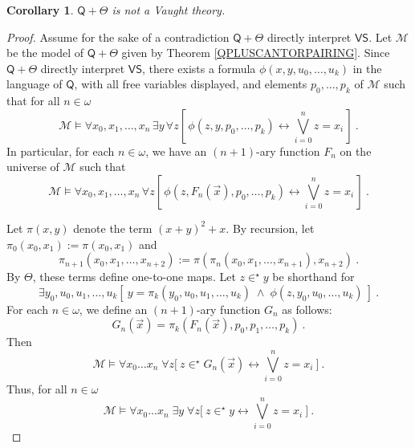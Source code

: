 \documentclass[10pt,a4paper, openany,  oldfontcommands]{memoir}
\newtheorem{corollary} [theorem] {Corollary}
\newtheorem{open problem} [theorem] {Open Problem}
\newtheorem{open question} [theorem] {Open Question}
\begin{document}
\begin{corollary}    \label{QPLUSCANTORPAIRINGCorollary}
$  \mathsf{Q} +  \Theta  $  is not a Vaught theory.
\end{corollary}
\begin{proof}
Assume for the sake of a contradiction $ \mathsf{Q} +  \Theta  $ directly interpret  $  \mathsf{VS} $.
Let  $  \mathcal{M} $  be the model of  $ \mathsf{Q} +  \Theta  $  given by Theorem  \ref{QPLUSCANTORPAIRING}. 
Since  $ \mathsf{Q} +  \Theta  $ directly interpret  $  \mathsf{VS} $, there exists a formula 
$  \phi (x, y  ,  u_0,  \ldots , u_k ) $  in the language of  $ \mathsf{Q} $, with all free variables displayed, 
 and   elements  $  p_0,  \ldots , p_k $  of   $  \mathcal{M} $  such that   for all  $  n  \in  \omega  $
\[
  \mathcal{M}   \models    
\forall  x_0,  x_1,  \ldots , x_n   \,   \exists   y   \,  \forall  z  \left[   \, 
  \phi ( z , y  ,  p_0,  \ldots , p_k ) \leftrightarrow   \bigvee_{ i = 0 }^{ n }  z = x_i   \,   \right] 
\          . 
\]
In particular, for each $ n  \in  \omega $, we have an $(n+1)$-ary function $  F_n $  on the universe of  $  \mathcal{M} $   such that 
\[
  \mathcal{M}   \models    
\forall  x_0,  x_1,  \ldots , x_n     \,  \forall  z  \left[   \, 
  \phi ( z,   F_n  \left(  \vec{x} \right)    ,  p_0,  \ldots , p_k ) \leftrightarrow   \bigvee_{ i = 0 }^{ n }  z = x_i   \,   \right] 
\          . 
\]




Let   $  \pi (x, y )   $ denote the term  $  (x+y)^2  + x  $.
By recursion, let    $   \pi_0 (x_0,  x_1  )   :=  \pi (x_0 , x_1 )   $   and  
 \[
    \pi_{ n+1}  (x_0,  x_1,  \ldots , x_{ n+2}   )   :=   \pi \left(   \pi_{ n}  (x_0,  x_1,  \ldots , x_{ n +1}    )   ,   x_{ n+2}   \right)    
  \       .
\]    
By $  \Theta $, these terms define one-to-one maps. 
Let    $  z  \in^{  \star }   y   $  be shorthand for 
\[
\exists  y_0 ,  u_0, u_1,  \ldots  ,  u_k  \left[    \    y =   \pi_{ k }   \left(  y_0 , u_0, u_1,  \ldots , u_k  \right)       \;  \wedge   \;  
 \phi ( z , y_0  ,  u_0,  \ldots , u_k )    \    \right]  
 \      .
\]
For each  $  n  \in \omega  $,  we define an $  (n+1) $-ary function  $G_n $  as follows: 
\[
G_n  \left(  \vec{x} \right)  =   \pi_k   \left(   F_n  \left(   \vec{x} \right)   ,   p_0, p_1 ,   \ldots , p_k   \right)
\      .
\]
Then 
\[
  \mathcal{M}   \models    
\forall  x_0  \ldots  x_n     \;   \forall z      
\big[        \               z   \in^{  \star }    G_n  \left(  \vec{x} \right)      \leftrightarrow  \bigvee_{ i = 0 }^{ n }   z  = x_i               \            \big] 
\          .
\]
Thus,    for  all $  n  \in  \omega   $
\[
  \mathcal{M}   \models    
\forall  x_0  \ldots  x_n    \;  \exists  y   \;   \forall z      
\big[        \               z   \in^{  \star }   y       \leftrightarrow  \bigvee_{ i = 0 }^{ n }   z  = x_i               \            \big] 
\          .
\tag{*}
\]






\end{proof}
\end{document}
